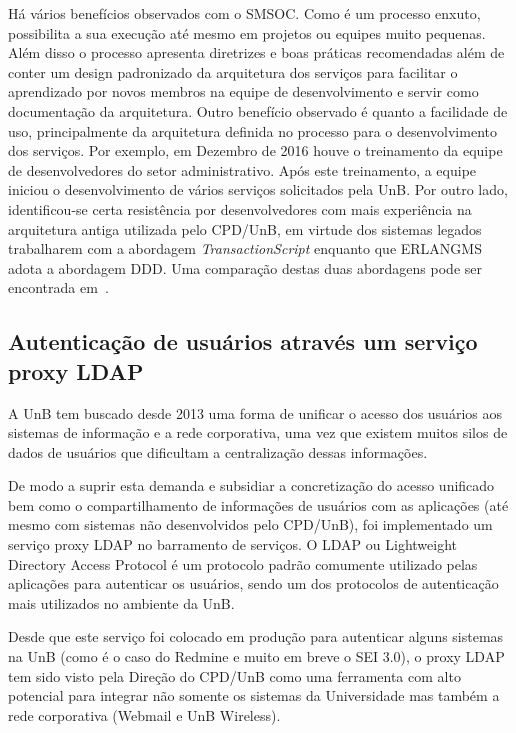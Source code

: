 \documentclass[12pt]{article}
\begin{document}
Há vários benefícios observados com o SMSOC.
Como é um processo enxuto, possibilita
a sua execução até mesmo em projetos ou equipes muito pequenas. Além disso
o processo apresenta diretrizes e boas práticas recomendadas além de conter
um design padronizado 
da arquitetura dos serviços para facilitar o aprendizado por novos membros na equipe
de desenvolvimento e servir como 
documentação da arquitetura. Outro benefício observado é quanto a facilidade 
de uso, principalmente da arquitetura definida no processo para o desenvolvimento dos serviços. 
Por exemplo, em Dezembro de 2016 houve o treinamento
da equipe de desenvolvedores do setor administrativo. Após este treinamento,
a equipe iniciou o desenvolvimento de vários serviços solicitados pela UnB. 
Por outro lado, identificou-se certa resistência por desenvolvedores com 
mais experiência na arquitetura antiga utilizada pelo CPD/UnB, 
em virtude dos sistemas legados trabalharem com 
a abordagem \textit{TransactionScript} enquanto que 
ERLANGMS adota a abordagem DDD. Uma comparação
destas duas abordagens pode ser encontrada em~\cite{agilar2016}.




\subsection{Autenticação de usuários através um serviço proxy LDAP}\label{ldap}

A UnB tem buscado desde 2013 uma forma de unificar o acesso dos usuários aos
sistemas de informação e a rede corporativa, uma vez que existem muitos
silos de dados de usuários que dificultam a centralização dessas informações. 

De modo a suprir esta demanda e subsidiar a concretização do acesso 
unificado bem como o compartilhamento de informações de usuários
com as aplicações (até mesmo com sistemas não desenvolvidos pelo CPD/UnB), 
foi implementado um serviço proxy LDAP no barramento de serviços.
O LDAP ou Lightweight Directory Access Protocol é um 
protocolo padrão comumente utilizado pelas aplicações para autenticar os usuários,
sendo um dos protocolos de autenticação mais utilizados no ambiente da UnB.

Desde que este serviço foi colocado em produção para 
autenticar alguns sistemas na UnB (como é o caso do Redmine e muito em breve o SEI 3.0),
o proxy LDAP tem sido visto pela Direção do CPD/UnB como uma ferramenta
com alto potencial para integrar não somente os sistemas da Universidade
mas também a rede corporativa (Webmail e UnB Wireless).
\end{document}

